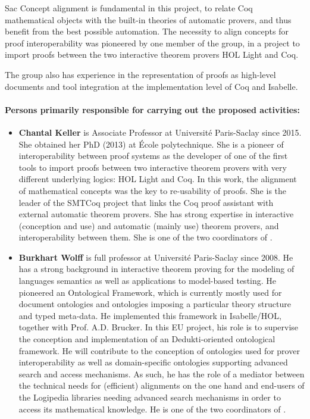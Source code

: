 \begin{sitedescription}{Sac}
Concept alignment is fundamental in this project, to relate Coq
mathematical objects with the built-in theories of automatic provers,
and thus benefit from the best possible automation. The necessity to
align concepts for proof interoperability was pioneered by one member of
the group, in a project to import proofs between the two interactive
theorem provers HOL Light and Coq.

The group also has experience in the representation of proofs as
high-level documents and tool integration at the implementation level
of Coq and Isabelle. 

\paragraph{Persons primarily responsible for carrying out the proposed
  activities:}

\begin{itemize} %

\item {\bf Chantal Keller} is Associate Professor at Université
  Paris-Saclay since 2015. She obtained her PhD (2013) at École
  polytechnique. She is a pioneer of interoperability between proof
  systems as the developer of one of the first tools to import proofs
  between two interactive theorem provers with very different underlying
  logics: HOL Light and Coq. In this work, the alignment of mathematical
  concepts was the key to re-usability of proofs. She is the leader of
  the SMTCoq project that links the Coq proof assistant with external
  automatic theorem provers. She has strong expertise in interactive
  (conception and use) and automatic (mainly use) theorem provers, and
  interoperability between them. She is one of the two coordinators of
  .

\item {\bf Burkhart Wolff} is full professor at Université
  Paris-Saclay since 2008. He has a strong background in interactive
  theorem proving for the modeling of languages semantics as well as
  applications to model-based testing. He pioneered an Ontological
  Framework, which is currently mostly used for document ontologies and
  ontologies imposing a particular theory structure and typed meta-data.
  He implemented this framework in Isabelle/HOL, together with Prof.
  A.D. Brucker. In this EU project, his role is to supervise the
  conception and implementation of an Dedukti-oriented ontological
  framework. He will contribute to the conception of ontologies used for
  prover interoperability as well as domain-specific ontologies
  supporting advanced search and access mechanisms. As such, he has the
  role of a mediator between the technical needs for (efficient)
  alignments on the one hand and end-users of the Logipedia libraries
  needing advanced search mechanisms in order to access its mathematical
  knowledge. He is one of the two coordinators of .

\end{itemize}

\end{sitedescription}


